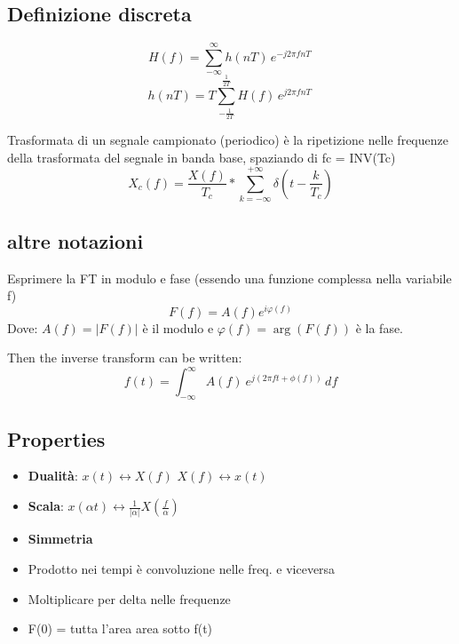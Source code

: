 \documentclass[12pt,a4paper,]{article}
\begin{document}
\subsection{Definizione discreta}
\begin{equation}
H(f) = \sum_{-\infty}^{\infty} \! h(nT) \,  e^{-j2\pi fnT} \, 
\end{equation}
\begin{equation}
h(nT) =T  \sum_{-\frac{1}{2T}}^{\frac{1}{2T}} \! H(f) \, e^{j2\pi fnT} \,
\end{equation}

Trasformata di un segnale campionato (periodico) è la ripetizione nelle frequenze della trasformata del segnale in banda base, spaziando di fc = INV(Tc)
\begin{equation}
X_{c} (f) = \frac{X(f)}{T_{c}} \ast \sum_{k = -\infty}^{+\infty} \delta \left(t-\frac{k}{T_{c}}\right)
\end{equation}
\subsection{altre notazioni}
Esprimere la FT in modulo e fase (essendo una funzione complessa nella variabile f)
\begin{equation}
 F(f) = A(f) e^{i\varphi(f)}
\end{equation}
Dove:  $A(f) = \left| F(f)\right|$ è il modulo e $\varphi (f) = \arg \left( F(f) \right)$ è la fase. 


Then the inverse transform can be written:
\begin{equation}
f(t) = \int _{-\infty}^\infty A(f)\ e^{ j\left(2\pi f t +\phi (f)\right)}\,df
\end{equation}



\subsection{Properties}
 \begin{itemize}
 \item  \textbf{Dualità}: $ x(t) \longleftrightarrow X(f)$ $ X(f)\longleftrightarrow x(t)$
 \item \textbf{Scala}: $ x(\alpha t)  \longleftrightarrow \frac{1}{|\alpha|}X(\frac{f}{\alpha})$
 \item \textbf{Simmetria}
 \item Prodotto nei tempi è convoluzione nelle freq. e viceversa
 \item Moltiplicare per delta nelle frequenze 
 \item F(0) = tutta l'area  area sotto f(t)
  \end{itemize}
\end{document}

